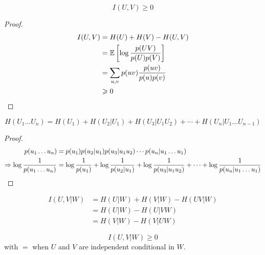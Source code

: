\begin{theorem}
    \[
        I(U,V) \geqslant 0    
    \]
\end{theorem}
\begin{proof}
    \[
        \begin{aligned}
            I(U,V) &= H(U) + H(V) - H(U,V)\\
            &= \mathbb{E}\left[ \log\frac{p(UV)}{p(U)p(V)} \right]\\
            &= \sum\limits_{u,v} p(uv) \frac{p(uv)}{p(u)p(v)}\\
          &\geqslant 0  
        \end{aligned}            
    \]
\end{proof}

\begin{theorem}
    \[
        H(U_1\ldots U_n) = H(U_1) + H(U_2\vert U_1) + H(U_3\vert U_1 U_2) + \cdots + H(U_n \vert U_1\ldots U_{n-1})
    \]
\end{theorem}
\begin{proof}
    \[
        \begin{aligned}
            p(u_1\ldots u_n) &= p(u_1) p(u_2 \vert u_1) p(u_3\vert u_1u_2) \cdots p(u_n \vert u_1\ldots u_1)\\
            \Rightarrow \log\frac{1}{p(u_1\ldots u_n)} &= \log\frac{1}{p(u_1)} +  \log\frac{1}{p(u_2 \vert u_1)}+ \log\frac{1}{p(u_3\vert u_1u_2)} + \cdots + \log\frac{1}{p(u_n \vert u_1\ldots u_1)}
        \end{aligned}
    \]
\end{proof}

\begin{definition}
    \[
        \begin{aligned}
            I(U,V \vert W) &= H(U\vert W) + H(V\vert W) - H(UV \vert W)\\
             &= H(U \vert W) - H(U \vert V W)\\
             &= H(V \vert W) - H(V \vert U W)
        \end{aligned}
    \]
\end{definition}

\begin{theorem}
    \[
        I(U,V \vert W) \geqslant 0
    \]
    with $=$ when $U$ and $V$ are independent conditional in $W$.
\end{theorem}

